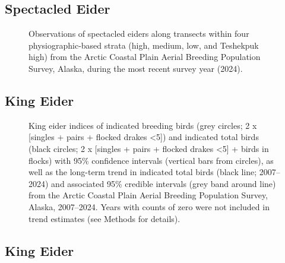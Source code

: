 \documentclass[
]{article}
\begin{document}
\endgroup{}

\newpage{}

\subsection*{Spectacled Eider}\label{spectacled-eider-2}

\begin{figure}


\caption{\label{fig-SPEImap}Observations of spectacled eiders along
transects within four physiographic-based strata (high, medium, low, and
Teshekpuk high) from the Arctic Coastal Plain Aerial Breeding Population
Survey, Alaska, during the most recent survey year (2024).}

\end{figure}%

\newpage{}

\subsection*{King Eider}\label{king-eider}

\begin{figure}


\caption{\label{fig-KIEI}King eider indices of indicated breeding birds
(grey circles; 2 x {[}singles + pairs + flocked drakes \textless5{]})
and indicated total birds (black circles; 2 x {[}singles + pairs +
flocked drakes \textless5{]} + birds in flocks) with 95\% confidence
intervals (vertical bars from circles), as well as the long-term trend
in indicated total birds (black line; 2007--2024) and associated 95\%
credible intervals (grey band around line) from the Arctic Coastal Plain
Aerial Breeding Population Survey, Alaska, 2007--2024. Years with counts
of zero were not included in trend estimates (see Methods for details).}

\end{figure}%

\newpage{}

\subsection*{King Eider}\label{king-eider-1}
\end{document}
